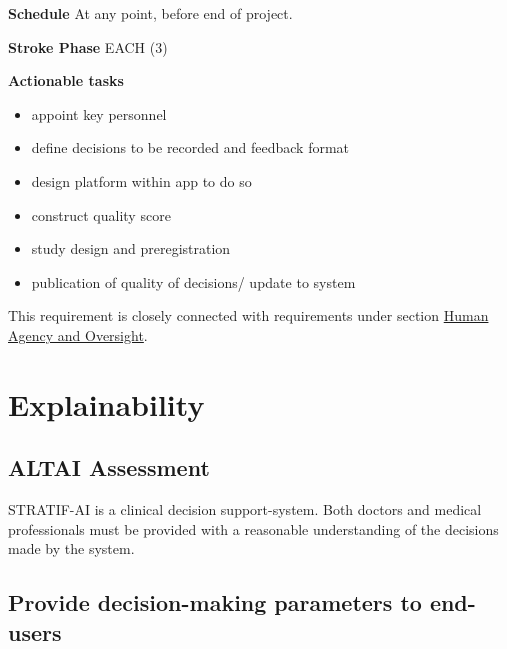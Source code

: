 \documentclass[
  letterpaper,
  DIV=11,
  numbers=noendperiod]{scrreport}
\providecommand{\tightlist}{%
  \setlength{\itemsep}{0pt}\setlength{\parskip}{0pt}}\usepackage{longtable,booktabs,array}
\begin{document}
\textbf{Schedule} At any point, before end of project.

\textbf{Stroke Phase} EACH (3)

\textbf{Actionable tasks}

\begin{itemize}
\tightlist
\item
  appoint key personnel
\item
  define decisions to be recorded and feedback format
\item
  design platform within app to do so
\item
  construct quality score
\item
  study design and preregistration
\item
  publication of quality of decisions/ update to system
\end{itemize}

\begin{tcolorbox}[enhanced jigsaw, arc=.35mm, breakable, coltitle=black, toptitle=1mm, colbacktitle=quarto-callout-note-color!10!white, toprule=.15mm, left=2mm, bottomrule=.15mm, opacitybacktitle=0.6, titlerule=0mm, colback=white, opacityback=0, title=\textcolor{quarto-callout-note-color}{\faInfo}\hspace{0.5em}{Note}, bottomtitle=1mm, colframe=quarto-callout-note-color-frame, leftrule=.75mm, rightrule=.15mm]

This requirement is closely connected with requirements under section
\protect\hyperlink{human-agency-and-oversight}{Human Agency and
Oversight}.

\end{tcolorbox}

\hypertarget{explainability}{%
\section{Explainability}\label{explainability}}

\hypertarget{altai-assessment-9}{%
\subsection*{ALTAI Assessment}\label{altai-assessment-9}}

STRATIF-AI is a clinical decision support-system. Both doctors and
medical professionals must be provided with a reasonable understanding
of the decisions made by the system.

\hypertarget{provide-decision-making-parameters-to-end-users}{%
\subsection{Provide decision-making parameters to
end-users}\label{provide-decision-making-parameters-to-end-users}}
\end{document}
